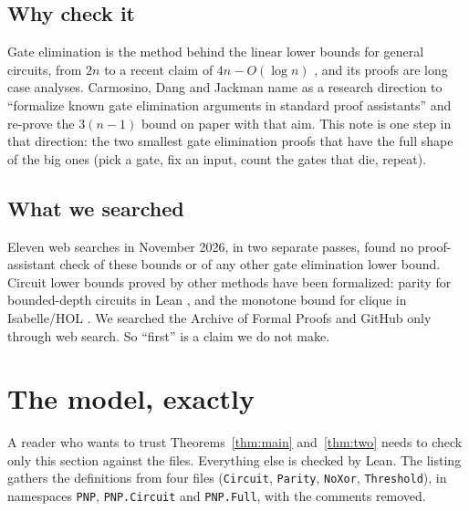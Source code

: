 \documentclass[11pt]{amsart}
\theoremstyle{definition}
\theoremstyle{remark}
\newcommand{\lean}[1]{\texttt{#1}}
\begin{document}
\subsection*{Why check it}
Gate elimination is the method behind the linear lower bounds for general circuits, from
$2n$ to a recent claim of $4n-O(\log n)$ \cite{MS26}, and its proofs are long case analyses. Carmosino, Dang and Jackman
\cite{CDJ26} name as a research direction to ``formalize known gate elimination arguments in
standard proof assistants'' and re-prove the $3(n-1)$ bound on paper with that aim. This note is one
step in that direction: the two smallest gate elimination proofs that have the full shape of
the big ones (pick a gate, fix an input, count the gates that die, repeat).

\subsection*{What we searched}
Eleven web searches in November 2026, in two separate passes, found no proof-assistant check of
these bounds or of any other gate elimination lower bound. Circuit lower bounds proved by other
methods have been formalized: parity for bounded-depth circuits in Lean \cite{ParityAC0}, and
the monotone bound for clique in Isabelle/HOL \cite{Thiemann22}. We searched the Archive of
Formal Proofs and GitHub only through web search. So ``first'' is a claim we do not make.

\section{The model, exactly}

A reader who wants to trust Theorems~\ref{thm:main} and~\ref{thm:two} needs to check only this
section against the files. Everything else is checked by Lean. The listing gathers the
definitions from four files (\lean{Circuit}, \lean{Parity}, \lean{NoXor}, \lean{Threshold}),
in namespaces \lean{PNP}, \lean{PNP.Circuit} and \lean{PNP.Full}, with the comments removed.
\end{document}
